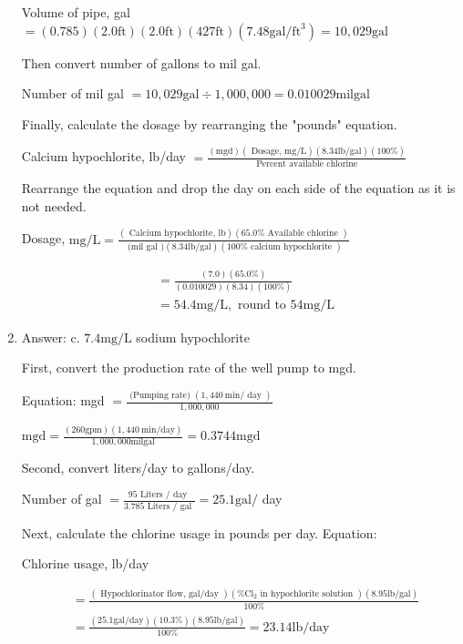 \documentclass[10pt]{article}
\begin{document}
\begin{enumerate}
Volume of pipe, gal $=(0.785)(2.0 \mathrm{ft})(2.0 \mathrm{ft})(427 \mathrm{ft})\left(7.48 \mathrm{gal} / \mathrm{ft}^{3}\right)=10,029 \mathrm{gal}$

Then convert number of gallons to mil gal.

Number of mil gal $=10,029 \mathrm{gal} \div 1,000,000=0.010029 \mathrm{mil} \mathrm{gal}$

Finally, calculate the dosage by rearranging the "pounds" equation.

Calcium hypochlorite, lb/day $=\frac{(\mathrm{mgd})(\text { Dosage, } \mathrm{mg} / \mathrm{L})(8.34 \mathrm{lb} / \mathrm{gal})(100 \%)}{\text { Percent available chlorine }}$

Rearrange the equation and drop the day on each side of the equation as it is not needed.

Dosage, $\mathrm{mg} / \mathrm{L}=\frac{(\text { Calcium hypochlorite, } \mathrm{lb})(65.0 \% \text { Available chlorine })}{\text { (mil gal })(8.34 \mathrm{lb} / \mathrm{gal})(100 \% \text { calcium hypochlorite })}$

$$
\begin{aligned}
&=\frac{(7.0)(65.0 \%)}{(0.010029)(8.34)(100 \%)} \\
&=54.4 \mathrm{mg} / \mathrm{L}, \text { round to } 54 \mathrm{mg} / \mathrm{L}
\end{aligned}
$$

  \item Answer: c. $7.4 \mathrm{mg} / \mathrm{L}$ sodium hypochlorite

First, convert the production rate of the well pump to mgd.

Equation: mgd $=\frac{\text { (Pumping rate) }(1,440 \mathrm{~min} / \text { day })}{1,000,000}$

$\mathrm{mgd}=\frac{(260 \mathrm{gpm})(1,440 \mathrm{~min} / \mathrm{day})}{1,000,000 \mathrm{mil} \mathrm{gal}}=0.3744 \mathrm{mgd}$

Second, convert liters/day to gallons/day.

Number of gal $=\frac{95 \text { Liters } / \text { day }}{3.785 \text { Liters } / \text { gal }}=25.1 \mathrm{gal} /$ day

Next, calculate the chlorine usage in pounds per day. Equation:

Chlorine usage, lb/day

$$
\begin{aligned}
&=\frac{(\text { Hypochlorinator flow, gal/day })\left(\% \mathrm{Cl}_{2} \text { in hypochlorite solution }\right)(8.95 \mathrm{lb} / \mathrm{gal})}{100 \%} \\
&=\frac{(25.1 \mathrm{gal} / \mathrm{day})(10.3 \%)(8.95 \mathrm{lb} / \mathrm{gal})}{100 \%}=23.14 \mathrm{lb} / \mathrm{day}
\end{aligned}
$$


\end{enumerate}
\end{document}
